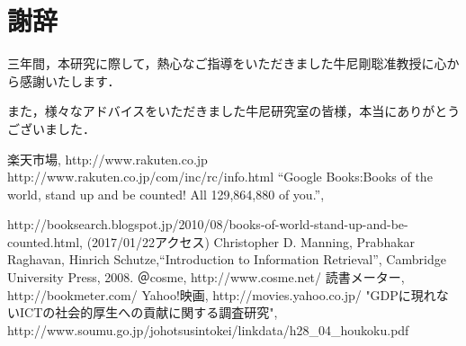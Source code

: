 \documentclass[a4paper,11pt,oneside,openany]{jsbook}
\begin{document}
\chapter*{謝辞}
三年間，本研究に際して，熱心なご指導をいただきました牛尼剛聡准教授に心から感謝いたします．
\par
また，様々なアドバイスをいただきました牛尼研究室の皆様，本当にありがとうございました．

\begin{thebibliography}{99}
	楽天市場, http://www.rakuten.co.jp
	http://www.rakuten.co.jp/com/inc/rc/info.html
	“Google Books:Books of the world, stand up and be counted! All 129,864,880 of you.”,
	\par
	http://booksearch.blogspot.jp/2010/08/books-of-world-stand-up-and-be-counted.html, (2017/01/22アクセス)
	Christopher D. Manning, Prabhakar Raghavan, Hinrich Schutze,“Introduction to Information Retrieval”, Cambridge University Press, 2008.
	＠cosme, http://www.cosme.net/
	読書メーター, http://bookmeter.com/
	Yahoo!映画, http://movies.yahoo.co.jp/
	"GDPに現れないICTの社会的厚生への貢献に関する調査研究", http://www.soumu.go.jp/johotsusintokei/linkdata/h28\_04\_houkoku.pdf
	

\end{thebibliography}
\end{document}
